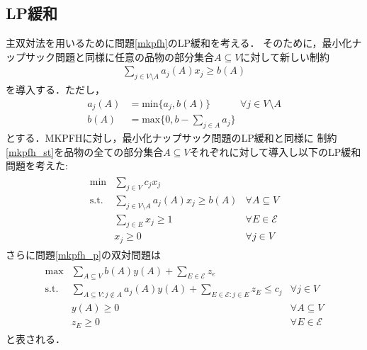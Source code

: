 \documentclass[11pt,dvipdfmx]{jarticle}
\numberwithin{equation}{section}
\begin{document}
    \subsection{LP緩和}
        主双対法を用いるために問題\eqref{mkpfh}のLP緩和を考える．
        そのために，最小化ナップサック問題と同様に任意の品物の部分集合$A\subseteq V$に対して新しい制約
        \begin{align}
            \sum_{j\in V\setminus A}{a_j(A)x_j}\ge b(A) \label{mkpfh_st}
        \end{align}
        を導入する．ただし，
        \begin{subequations}
            \begin{align}
                a_j(A) &= \mathrm{min}\{a_j, b(A)\} \qquad\quad\forall j\in V\setminus A \label{kci_a2}\\
                b(A) &= \mathrm{max}\{0, b-\displaystyle\sum_{j\in A}{a_j}\}\label{kci_b2}
            \end{align}
        \end{subequations}
        とする．MKPFHに対し，最小化ナップサック問題のLP緩和と同様に
        制約\eqref{mkpfh_st}を品物の全ての部分集合$A\subseteq V$それぞれに対して導入し以下のLP緩和問題を考えた:
        \begin{align}
            \begin{array}{cll}
            \mathrm{min}  & \displaystyle\sum_{j\in V}{c_j x_j} & \\
            \mathrm{s.t.} & \displaystyle\sum_{j\in V\setminus A}{a_j(A)x_j} \ge b(A) &\forall A\subseteq V\\
                          & \displaystyle\sum_{j\in E}{x_j} \ge 1 & \forall E\in \mathcal{E}\\
                          & x_j \ge 0 & \forall j\in V 
            \end{array}
            \label{mkpfh_p}
        \end{align}
        さらに問題\eqref{mkpfh_p}の双対問題は
        \begin{align}
            \begin{array}{cll}
                \mathrm{max}  & \displaystyle\sum_{A\subseteq V}{b(A)y(A)}+\sum_{E\in \mathcal{E}}{z_e} &\\
                \mathrm{s.t.} & \displaystyle\sum_{A\subseteq V:j\notin A}{a_j(A)y(A)}+\sum_{E\in \mathcal{E}: j\in E}{z_E}\le c_j &\forall j\in V\\
                              & y(A)\ge0  &\forall A \subseteq V\\
                              & z_E\ge 0  &\forall E\in \mathcal{E}
            \end{array}
            \label{mkpfh_d}
        \end{align}
        と表される．
\end{document}
